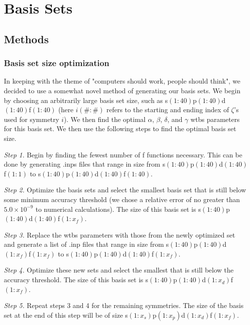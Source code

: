 \documentclass[12pt]{book}
\begin{document}


\chapter{Basis Sets}
\section{Methods}
\subsection{Basis set size optimization}
In keeping with the theme of "computers should work, people should think", we decided to use a somewhat novel method of generating our basis sets. We begin by choosing an arbitrarily large basis set size, such as s$(1:40)$p$(1:40)$d$(1:40)$f$(1:40)$ (here $i(\#:\#)$ refers to the starting and ending index of $\zeta$'s used for symmetry $i$). We then find the optimal $\alpha$, $\beta$, $\delta$, and $\gamma$ wtbs parameters for this basis set. We then use the following steps to find the optimal basis set size.

\textit{Step 1.} Begin by finding the fewest number of f functions necessary. This can be done by generating .inps files that range in size from s$(1:40)$p$(1:40)$d$(1:40)$f$(1:1)$ to s$(1:40)$p$(1:40)$d$(1:40)$f$(1:40)$.

\textit{Step 2.} Optimize the basis sets and select the smallest basis set that is still below some minimum accuracy threshold (we chose a relative error of no greater than $5.0\times10^{-9}$ to numerical calculations). The size of this basis set is s$(1:40)$p$(1:40)$d$(1:40)$f$(1:x_{f})$.

\textit{Step 3.} Replace the wtbs parameters with those from the newly optimized set and generate a list of .inp files that range in size from s$(1:40)$p$(1:40)$d$(1:x_{f})$f$(1:x_{f})$ to s$(1:40)$p$(1:40)$d$(1:40)$f$(1:x_{f})$.

\textit{Step 4.} Optimize these new sets and select the smallest that is still below the accuracy threshold. The size of this basis set is s$(1:40)$p$(1:40)$d$(1:x_{d})$f$(1:x_{f})$.

\textit{Step 5.} Repeat steps 3 and 4 for the remaining symmetries. The size of the basis set at the end of this step will be of size s$(1:x_{s})$p$(1:x_{p})$d$(1:x_{d})$f$(1:x_{f})$.
\end{document}
